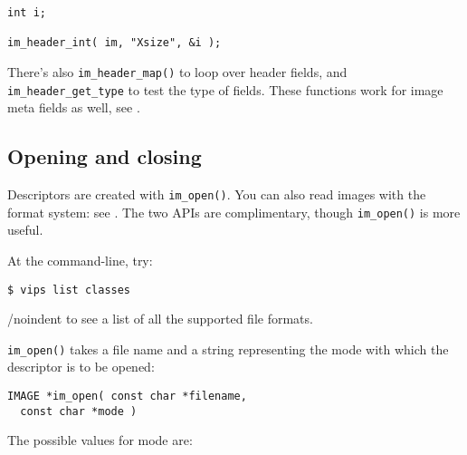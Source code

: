 \begin{verbatim}
int i;

im_header_int( im, "Xsize", &i );
\end{verbatim}

There's also \verb+im_header_map()+ to loop over header fields, and
\verb+im_header_get_type+ to test the type of fields. These functions work for
image meta fields as well, see .

\subsection{Opening and closing}
\label{sec:open}

Descriptors are created with \verb+im_open()+. You can also read images with
the format system: see . The two APIs are complimentary,
though \verb+im_open()+ is more useful.

At the command-line, try:

\begin{verbatim}
$ vips list classes
\end{verbatim}

/noindent
to see a list of all the supported file formats.

\verb+im_open()+ takes a file name and a string representing the mode with
which the descriptor is to be opened:

\begin{verbatim}
IMAGE *im_open( const char *filename, 
  const char *mode )
\end{verbatim}

The possible values for mode are:
  
